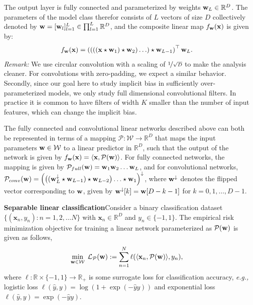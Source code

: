 \documentclass{article}
\renewcommand{\c}{\mathcal}
\newcommand{\bR}{\mathbb{R}}
\renewcommand{\hat}{\widehat}
\newcommand{\innerprod}[2]{\langle #1,#2 \rangle}
\newcommand{\eg}{\textit{e.g.,} }
\renewcommand{\u}[1][]{\ifthenelse{\equal{#1}{}}{\mathbf{w}}{\mathbf{w}^{(#1)}}}
\newcommand{\x}{\mathbf{x}}
\renewcommand{\P}{\mathcal{P}}
\begin{document}
The output layer is fully connected and parameterized by weights $\u_L \in \bR^D$. The  parameters of the model class therefor consists of $L$ vectors of size $D$ collectively denoted by ${\u=[\u_l]_{l=1}^{L}\in\prod_{l=1}^L \bR^{D}}$, and the composite linear map $f_{\u}(\x)$  is given by:
\begin{equation}
f_{\u}(\x)=\left((((\x\star\u_1)\star\u_2)\ldots)\star\u_{L-1}\right)^\top \u_L.
\label{eq:cn}
\end{equation}
\textit{Remark: }We use circular convolution with a scaling of $\nicefrac{1}{\sqrt{D}}$ to make the analysis cleaner. For convolutions with zero-padding, we expect a similar behavior. Secondly, since our goal here to study implicit bias in sufficiently over-parameterized models, we only study full dimensional convolutional filters. In practice it is common to have filters of width $K$  smaller than the number of input features, which can change the implicit  bias. 


The  fully connected and convolutional linear networks described above can both be represented in terms of a mapping $\P:\c{W}\to\bR^D$ that maps the input parameters $\u\in\c{W}$ to a linear predictor in $\bR^D$, such that the output of the network is given by $f_{\u}({\x})=\innerprod{\x}{\P(\u)}$.  
For fully connected networks, the mapping  is given by $\P_{full}(\u)=\u_1\u_{2}\ldots\u_L$, and for convolutional networks, $\P_{conv}(\u)=\left(\big((\u_L^{\downarrow}\star\u_{L-1})\star\u_{L-2}\big)\ldots\star\u_{1}\right)^{\downarrow}$, where $\u^{\downarrow}$ denotes the flipped vector corresponding to $\u$, given by ${\u}^{\downarrow}[k]=\u{[D-k-1]}$ for $k=0,1,\ldots,D-1$.  

\textbf{Separable linear classification}\quad Consider a binary classification dataset $\{(\x_{n},y_{n}):n=1,2,\ldots N\}$ with  $\x_n\in\bR^D$ and  $y_n\in\{-1,1\}$. The empirical risk minimization objective for training a linear network parameterized as $\P(\u)$ is  given as follows,
\begin{equation}
\min_{\u\in\c{W}}\;\c{L}_{\P}(\u) := \sum_{n=1}^{N} \ell(\innerprod{\x_n}{\P(\u)},y_n),
\label{eq:lmu}
\end{equation}
where $\ell:\bR\times \{-1,1\}\to\bR_+$ is some surrogate loss for classification accuracy, \eg logistic loss  $\ell(\hat{y},y)=\log(1+\exp(-\hat{y}y))$ and exponential loss $\ell(\hat{y},y)= \exp(-\hat{y}y)$. 
\end{document}
